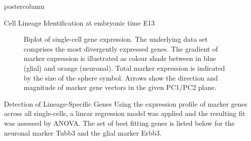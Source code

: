 \documentclass{beamer}
\begin{document}
\begin{frame}
\begin{columns}
\begin{column}{.45\textwidth}
\begin{beamercolorbox}[center]{postercolumn}
\begin{minipage}{.98\textwidth}
{\begin{myblock}{Cell Lineage Identification at embryonic time E13}
\begin{figure}
\begin{minipage}{0.9\textwidth}
	\caption{Biplot of single-cell gene expression. The underlying data set
		comprises the most divergently expressed genes. The gradient of marker
		expression is illustrated as colour shade between in blue (glial) and
		orange (neuronal).
		Total marker expression is indicated by the size of the sphere symbol.
		Arrows show the direction and magnitude of marker gene vectors
		in the given PC1/PC2 plane.}
	\label{fig:biplot}
\end{minipage}
\end{figure}
\end{myblock}\vfill
\begin{myblock}{Detection of Lineage-Specific Genes}
Using the expression profile of marker genes across all single-cells,
a linear regression model was applied and the resulting fit was assessed
by ANOVA. The set of best fitting genes is listed below for the neuronal
marker Tubb3 and the glial marker Erbb3.
\begin{figure}
\begin{minipage}{0.7\textwidth}

\end{minipage}
\end{figure}
\end{myblock}}
\end{minipage}
\end{beamercolorbox}
\end{column}
\end{columns}
\end{frame}
\end{document}
